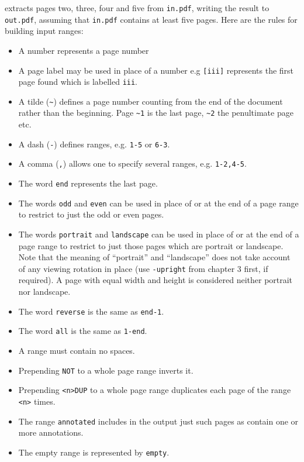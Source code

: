 \documentclass{book}
\begin{document}
  \noindent extracts pages two, three, four and five from \texttt{in.pdf},
writing the result to \texttt{out.pdf}, assuming that \texttt{in.pdf} contains
at least five pages.
  Here are the rules for building input ranges:
  \begin{itemize}
    \item A number represents a page number
    \item A page label may be used in place of a number e.g \texttt{[iii]} represents the first page found which is labelled \texttt{iii}.
    \item A tilde (\texttt{\~{}}) defines a page number counting from the end of the document rather than the beginning. Page \texttt{\~{}1} is the last page, \texttt{\~{}2} the penultimate page etc.
    \item A dash (\texttt{-}) defines ranges, e.g. \texttt{1-5} or \texttt{6-3}.
    \item A comma (\texttt{,}) allows one to specify several ranges, e.g. \texttt{1-2,4-5}.
    \item The word \texttt{end} represents the last page.
    \item The words \texttt{odd} and \texttt{even} can be used in place of or at the end of a page range to restrict to just the odd or even pages.
    \item The words \texttt{portrait} and \texttt{landscape} can be used in place of or at the end of a page range to restrict to just those pages which are portrait or landscape. Note that the meaning of ``portrait'' and ``landscape'' does not take account of any viewing rotation in place (use \texttt{-upright} from chapter 3 first, if required). A page with equal width and height is considered neither portrait nor landscape.
    \item The word \texttt{reverse} is the same as \texttt{end-1}.
    \item The word \texttt{all} is the same as \texttt{1-end}.
    \item A range must contain no spaces.
    \item Prepending \texttt{NOT} to a whole page range inverts it. 
    \item Prepending \verb!<n>!\texttt{DUP} to a whole page range duplicates each page of the range \verb!<n>! times.
    \item The range \texttt{annotated} includes in the output just such pages as contain one or more annotations.
    \item The empty range is represented by \texttt{empty}.
  \end{itemize}
 
\end{document}
